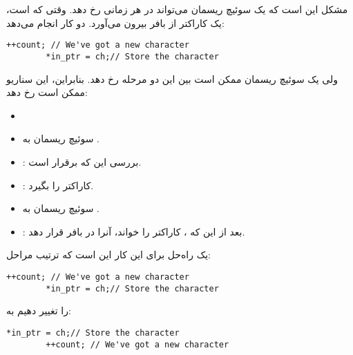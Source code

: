 \section{}
\paragraph{}\label{answer:92}
مشکل این است که یک سوئیچ ریسمان می‌تواند در هر زمانی رخ دهد. وقتی که  است،  یک کاراکتر از بافر بیرون می‌آورد.  دو کار انجام می‌دهد:
\begin{LTR}
    \begin{lstlisting}[style=C++Style]
        ++count; // We've got a new character
        *in_ptr = ch;// Store the character
    \end{lstlisting}
\end{LTR}

ولی یک سوئیچ ریسمان ممکن است بین این دو مرحله رخ دهد. بنابراین، این سناریو ممکن است رخ دهد:
\begin{itemize}
    \item {}
    \item سوئیچ ریسمان به .
    \item {}: بررسی این که  برقرار است.
    \item {}: کاراکتر را بگیرد.
    \item سوئیچ ریسمان به .
    \item {}: بعد از این که ، کاراکتر را خواند، آنرا در بافر قرار دهد.
\end{itemize}

یک راه‌حل برای این کار این است که ترتیب مراحل:
\begin{LTR}
    \begin{lstlisting}[style=C++Style]
        ++count; // We've got a new character
        *in_ptr = ch;// Store the character
    \end{lstlisting}
\end{LTR}
را تغییر دهیم به:
\begin{LTR}
    \begin{lstlisting}[style=C++Style]
        *in_ptr = ch;// Store the character
        ++count; // We've got a new character
    \end{lstlisting}
\end{LTR}

